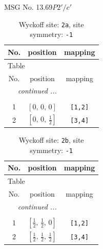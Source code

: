 \documentclass[fleqn,8pt]{jsarticle}
\begin{document}
\setcounter{MaxMatrixCols}{32}

\renewcommand{\tablename}{Table~}
\renewcommand{\figurename}{Figure~}
\begin{center}
\LARGE
MSG No. 13.69\quad$P2'/c'$
\end{center}
\renewcommand{\arraystretch}{1.2}
\begin{longtable}{ccc}
\caption{Wyckoff site: {\tt 2a}, site symmetry: {\tt -1}}
 \\
 \hline \hline
No. & position & mapping \\ \hline \endfirsthead

\multicolumn{2}{l}{\tablename\ \thetable{}} \\
 \hline \hline
No. & position & mapping \\ \hline \endhead

 \hline \hline
\multicolumn{2}{r}{\footnotesize\it continued ...} \\ \endfoot

 \hline \hline
\multicolumn{2}{r}{} \\ \endlastfoot

1 & $\left[ 0,\, 0,\, 0 \right]$ & {\tt [1,2]} \\ \hline
2 & $\left[ 0,\, 0,\, \frac{1}{2} \right]$ & {\tt [3,4]} \\
\end{longtable}
\renewcommand{\arraystretch}{1.2}
\begin{longtable}{ccc}
\caption{Wyckoff site: {\tt 2b}, site symmetry: {\tt -1}}
 \\
 \hline \hline
No. & position & mapping \\ \hline \endfirsthead

\multicolumn{2}{l}{\tablename\ \thetable{}} \\
 \hline \hline
No. & position & mapping \\ \hline \endhead

 \hline \hline
\multicolumn{2}{r}{\footnotesize\it continued ...} \\ \endfoot

 \hline \hline
\multicolumn{2}{r}{} \\ \endlastfoot

1 & $\left[ \frac{1}{2},\, \frac{1}{2},\, 0 \right]$ & {\tt [1,2]} \\ \hline
2 & $\left[ \frac{1}{2},\, \frac{1}{2},\, \frac{1}{2} \right]$ & {\tt [3,4]} \\
\end{longtable}
\renewcommand{\arraystretch}{1.2}
\end{document}

